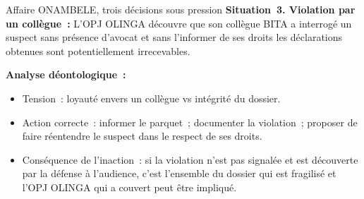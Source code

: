 \begin{boxscenario}{Affaire ONAMBELE, trois décisions sous pression}
\textbf{Situation~3. Violation par un collègue~:}
L'OPJ OLINGA découvre que son collègue BITA a interrogé un suspect sans
présence d'avocat et sans l'informer de ses droits les déclarations
obtenues sont potentiellement irrecevables.

\textbf{Analyse déontologique~:}
\begin{itemize}
    \item Tension~: loyauté envers un collègue vs intégrité du dossier.
    \item Action correcte~: informer le parquet~; documenter la violation~;
          proposer de faire réentendre le suspect dans le respect de
          ses droits.
    \item Conséquence de l'inaction~: si la violation n'est pas signalée
          et est découverte par la défense à l'audience, c'est
          l'ensemble du dossier qui est fragilisé et l'OPJ OLINGA
          qui a couvert peut être impliqué.
\end{itemize}
\end{boxscenario}

\separateur

